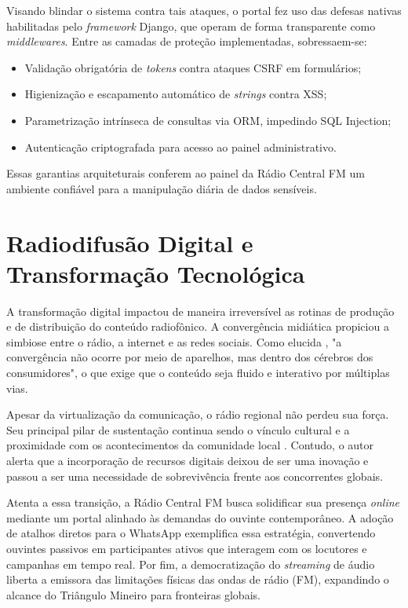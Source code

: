 \documentclass[12pt, openright, oneside, a4paper, brazil]{ads-unipac-abntex2}
\begin{document}
Visando blindar o sistema contra tais ataques, o portal fez uso das defesas nativas habilitadas pelo \textit{framework} Django, que operam de forma transparente como \textit{middlewares}. Entre as camadas de proteção implementadas, sobressaem-se:

\begin{itemize}
    \item Validação obrigatória de \textit{tokens} contra ataques CSRF em formulários;
    \item Higienização e escapamento automático de \textit{strings} contra XSS;
    \item Parametrização intrínseca de consultas via ORM, impedindo SQL Injection;
    \item Autenticação criptografada para acesso ao painel administrativo.
\end{itemize}

Essas garantias arquiteturais conferem ao painel da Rádio Central FM um ambiente confiável para a manipulação diária de dados sensíveis.

\section{Radiodifusão Digital e Transformação Tecnológica}

A transformação digital impactou de maneira irreversível as rotinas de produção e de distribuição do conteúdo radiofônico. A convergência midiática propiciou a simbiose entre o rádio, a internet e as redes sociais. Como elucida , "a convergência não ocorre por meio de aparelhos, mas dentro dos cérebros dos consumidores", o que exige que o conteúdo seja fluido e interativo por múltiplas vias.

Apesar da virtualização da comunicação, o rádio regional não perdeu sua força. Seu principal pilar de sustentação continua sendo o vínculo cultural e a proximidade com os acontecimentos da comunidade local \cite{ferraretto}. Contudo, o autor alerta que a incorporação de recursos digitais deixou de ser uma inovação e passou a ser uma necessidade de sobrevivência frente aos concorrentes globais.

Atenta a essa transição, a Rádio Central FM busca solidificar sua presença \textit{online} mediante um portal alinhado às demandas do ouvinte contemporâneo. A adoção de atalhos diretos para o WhatsApp exemplifica essa estratégia, convertendo ouvintes passivos em participantes ativos que interagem com os locutores e campanhas em tempo real. Por fim, a democratização do \textit{streaming} de áudio liberta a emissora das limitações físicas das ondas de rádio (FM), expandindo o alcance do Triângulo Mineiro para fronteiras globais.
\end{document}
